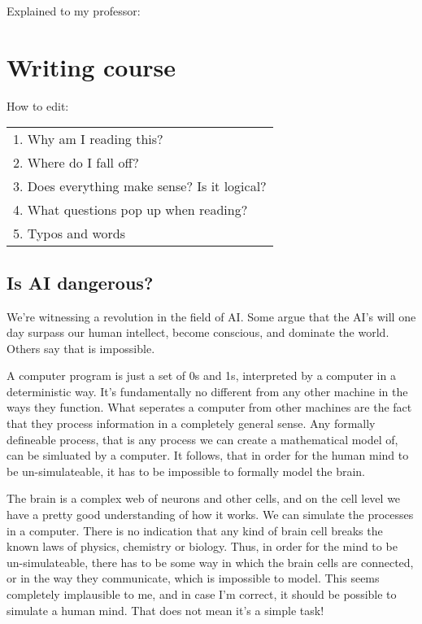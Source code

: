 \documentclass[UKenglish]{ifimaster}  %
\begin{document}
Explained to my professor:

\chapter{Writing course}
How to edit:

\begin{tabular}{l}
1. Why am I reading this? \\
2. Where do I fall off?\\
3. Does everything make sense? Is it logical?\\
4. What questions pop up when reading?\\
5. Typos and words
\end{tabular}


\section{Is AI dangerous?}

We're witnessing a revolution in the field of AI. Some argue that the AI's will one day surpass our
human intellect, become conscious, and dominate the world. Others say that is impossible.

A computer program is just a set of 0s and 1s, interpreted by a computer in a deterministic way. It's
fundamentally no different from any other machine in the ways they function. What seperates a computer from other machines are the fact that they process information in a completely general sense. Any formally defineable process, that is any process we can create a mathematical model of, can be simluated by a computer. It follows, that in order for the human mind to be un-simulateable, it has to be impossible to formally model the brain.

The brain is a complex web of neurons and other cells, and on the cell level we have a pretty good understanding of how it works. We can simulate the processes in a computer. There is no indication that any kind of brain cell breaks the known laws of physics, chemistry or biology. Thus, in order for the mind to be un-simulateable, there has to be some way in which the brain cells are connected, or in the way they communicate, which is impossible to model. This seems completely implausible to me, and in case I'm correct, it should be possible to simulate a human mind. That does not mean it's a simple task!




\begin{tabular}{l}
  
\end{tabular}
\end{document}
